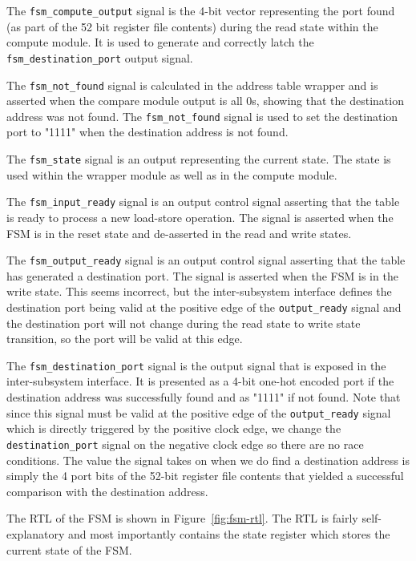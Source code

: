 \documentclass{article}
\begin{document}
The \texttt{fsm\_compute\_output} signal is the 4-bit vector representing the port found (as part of the 52 bit register file contents) during the read state within the compute module. It is used to generate and correctly latch the \texttt{fsm\_destination\_port} output signal.

The \texttt{fsm\_not\_found} signal is calculated in the address table wrapper and is asserted when the compare module output is all 0s, showing that the destination address was not found. The \texttt{fsm\_not\_found} signal is used to set the destination port to "1111" when the destination address is not found.

The \texttt{fsm\_state} signal is an output representing the current state. The state is used within the wrapper module as well as in the compute module.

The \texttt{fsm\_input\_ready} signal is an output control signal asserting that the table is ready to process a new load-store operation. The signal is asserted when the FSM is in the reset state and de-asserted in the read and write states.

The \texttt{fsm\_output\_ready} signal is an output control signal asserting that the table has generated a destination port. The signal is asserted when the FSM is in the write state. This seems incorrect, but the inter-subsystem interface defines the destination port being valid at the positive edge of the \texttt{output\_ready} signal and the destination port will not change during the read state to write state transition, so the port will be valid at this edge.

The \texttt{fsm\_destination\_port} signal is the output signal that is exposed in the inter-subsystem interface. It is presented as a 4-bit one-hot encoded port if the destination address was successfully found and as "1111" if not found. Note that since this signal must be valid at the positive edge of the \texttt{output\_ready} signal which is directly triggered by the positive clock edge, we change the \texttt{destination\_port} signal on the negative clock edge so there are no race conditions. The value the signal takes on when we do find a destination address is simply the 4 port bits of the 52-bit register file contents that yielded a successful comparison with the destination address.

The RTL of the FSM is shown in Figure~\ref{fig:fsm-rtl}. The RTL is fairly self-explanatory and most importantly contains the state register which stores the current state of the FSM.
\end{document}
